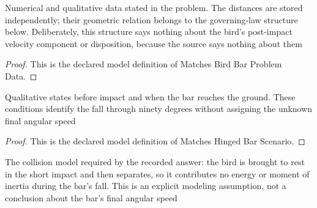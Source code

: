 \begin{definition}
  \label{def:physics:phyx-mini-0790:phyxminiproblems-problemphyxmini0790-matchesbirdbarproblemdata}
  Numerical and qualitative data stated in the problem. The distances are stored independently; their geometric relation belongs to the governing-law structure below. Deliberately, this structure says nothing about the bird's post-impact velocity component or disposition, because the source says nothing about them
\end{definition}
\begin{proof}
  This is the declared model definition of Matches Bird Bar Problem Data.
\end{proof}
\begin{definition}
  \label{def:physics:phyx-mini-0790:phyxminiproblems-problemphyxmini0790-matcheshingedbarscenario}
  Qualitative states before impact and when the bar reaches the ground. These conditions identify the fall through ninety degrees without assigning the unknown final angular speed
\end{definition}
\begin{proof}
  This is the declared model definition of Matches Hinged Bar Scenario.
\end{proof}
\begin{definition}
  \label{def:physics:phyx-mini-0790:phyxminiproblems-problemphyxmini0790-usesbirdstoppingimpactidealization}
  The collision model required by the recorded answer: the bird is brought to rest in the short impact and then separates, so it contributes no energy or moment of inertia during the bar's fall. This is an explicit modeling assumption, not a conclusion about the bar's final angular speed
\end{definition}
